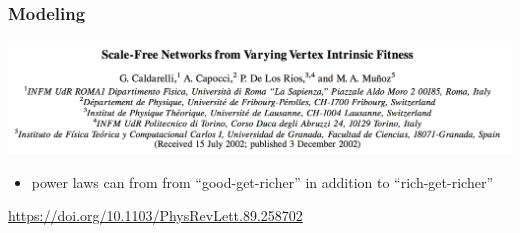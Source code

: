 \documentclass[aspectratio=169]{beamer}
\begin{document}
\begin{frame}
\frametitle{Modeling}

\begin{center}
\includegraphics[width=\textwidth]{figures/caldarelli_scale-free_2002_title}
\end{center}

\begin{itemize}
\item power laws can from from ``good-get-richer'' in addition to ``rich-get-richer''
\end{itemize}

\vfill
\url{https://doi.org/10.1103/PhysRevLett.89.258702}


\end{frame}
\end{document}
